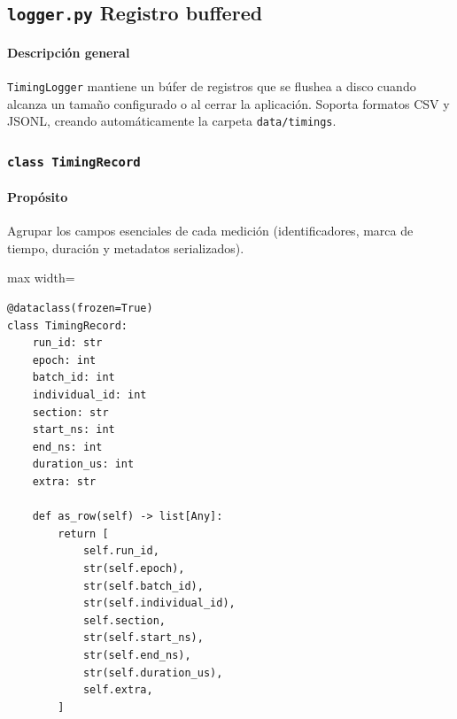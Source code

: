 
\subsection{\texttt{logger.py} \- Registro buffered}
\paragraph{Descripción general}
\texttt{TimingLogger} mantiene un búfer de registros que se flushea a disco cuando alcanza un tamaño configurado o al cerrar la aplicación. Soporta formatos CSV y JSONL, creando automáticamente la carpeta \texttt{data/timings}.

\subsubsection{\texttt{class TimingRecord}}
\paragraph{Propósito} Agrupar los campos esenciales de cada medición (identificadores, marca de tiempo, duración y metadatos serializados).

\begin{listing}[H]
\caption{Conversión de un \texttt{TimingRecord} a filas CSV}
\begin{adjustbox}{max width=\textwidth}
\begin{minipage}{\textwidth}
\begin{verbatim}
@dataclass(frozen=True)
class TimingRecord:
    run_id: str
    epoch: int
    batch_id: int
    individual_id: int
    section: str
    start_ns: int
    end_ns: int
    duration_us: int
    extra: str

    def as_row(self) -> list[Any]:
        return [
            self.run_id,
            str(self.epoch),
            str(self.batch_id),
            str(self.individual_id),
            self.section,
            str(self.start_ns),
            str(self.end_ns),
            str(self.duration_us),
            self.extra,
        ]
\end{verbatim}
\end{minipage}
\end{adjustbox}
\end{listing}


